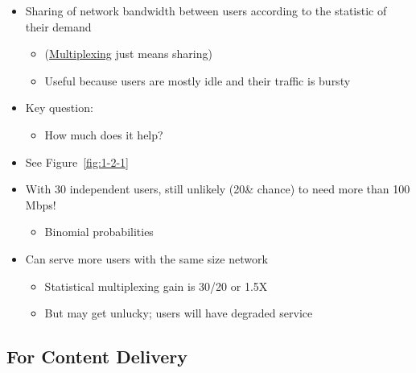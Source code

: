 \documentclass[12pt]{ctexart}   %
\begin{document}
	\begin{itemize}
		\item Sharing of network bandwidth between users according to the statistic of their demand
		\begin{itemize}
			\item (\underline{Multiplexing} just means sharing)
			\item Useful because users are mostly idle and their traffic is bursty
		\end{itemize}
		
		\item Key question:
		\begin{itemize}
			\item How much does it help?
		\end{itemize}
		
		\item See Figure~\ref{fig:1-2-1}
		
		\item With 30 independent users, still unlikely (20\& chance) to need more than 100 Mbps!
		\begin{itemize}
			\item Binomial probabilities
		\end{itemize}
		
		\item Can serve more users with the same size network
		\begin{itemize}
			\item Statistical multiplexing gain is 30/20 or 1.5X
			\item But may get unlucky; users will have degraded service
		\end{itemize}
		
	\end{itemize}
	
	\subsection{For Content Delivery}
	
\end{document}
